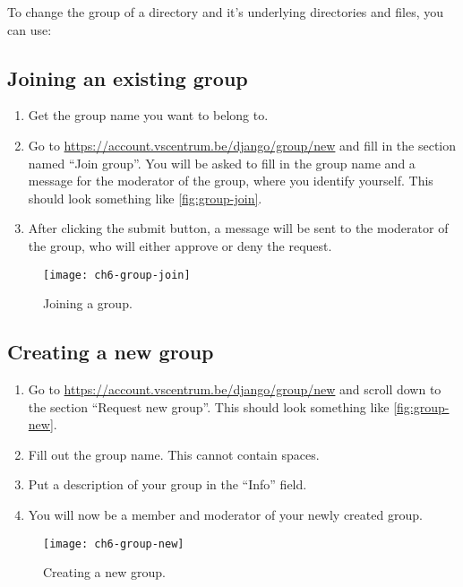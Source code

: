 To change the group of a directory and it's underlying directories and files, you can use:

\begin{prompt}
\end{prompt}

\subsection{Joining an existing group}

\begin{enumerate}
    \item Get the group name you want to belong to.
    \item Go to \url{https://account.vscentrum.be/django/group/new} and fill in the
        section named ``Join group''. You will be asked to fill in the group name and a message for
        the moderator of the group, where you identify yourself. This should look something
        like \autoref{fig:group-join}.
    \item After clicking the submit button, a message will be sent to the moderator
    of the group, who will either approve or deny the request.
\end{enumerate}

\begin{figure}[!htbp]
  \caption{Joining a group.}
  \centering
    \texttt{[image: ch6-group-join]}
\end{figure}\label{fig:group-join}

\subsection{Creating a new group}

\begin{enumerate}
    \item Go to \url{https://account.vscentrum.be/django/group/new} and scroll down
        to the section ``Request new group''. This should look something like
        \autoref{fig:group-new}.
    \item Fill out the group name. This cannot contain spaces.
    \item Put a description of your group in the ``Info'' field.
    \item You will now be a member and moderator of your newly created group.
\end{enumerate}

\begin{figure}[!htbp]
  \caption{Creating a new group.}
  \centering
    \texttt{[image: ch6-group-new]}
\end{figure}\label{fig:group-new}

